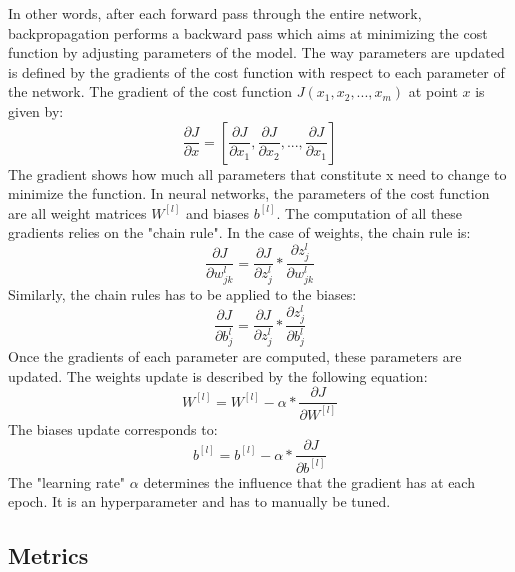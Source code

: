 In other words, after each forward pass through the entire network, backpropagation performs a backward pass which aims at minimizing the cost function by adjusting parameters of the model. The way parameters are updated is defined by the gradients of the cost function with respect to each parameter of the network. The gradient of the cost function $J(x_{1}, x_{2}, ..., x_{m})$ at point $x$ is given by:
\begin{equation}
\frac{\partial J}{\partial x} = [\frac{\partial J}{\partial x_{1}}, \frac{\partial J}{\partial x_{2}}, ..., \frac{\partial J}{\partial x_{1}}]
\end{equation}
The gradient shows how much all parameters that constitute x need to change to minimize the function. In neural networks, the parameters of the cost function are all weight matrices $W^{[l]}$ and biases $b^{[l]}$. The computation of all these gradients relies on the "chain rule". In the case of weights, the chain rule is:
\begin{equation}
\frac{\partial J}{\partial w_{jk}^{l}} = \frac{\partial J}{\partial z_{j}^{l}} * \frac{\partial z_{j}^{l}}{\partial w_{jk}^{l}}
\end{equation}
Similarly, the chain rules has to be applied to the biases:
\begin{equation}
\frac{\partial J}{\partial b_{j}^{l}} = \frac{\partial J}{\partial z_{j}^{l}} * \frac{\partial z_{j}^{l}}{\partial b_{j}^{l}}
\end{equation}
Once the gradients of each parameter are computed, these parameters are updated. The weights update is described by the following equation:
\begin{equation}
W^{[l]} = W^{[l]} - \alpha * \frac{\partial J}{\partial W^{[l]}}
\end{equation}
The biases update corresponds to:
\begin{equation}
b^{[l]} = b^{[l]} - \alpha * \frac{\partial J}{\partial b^{[l]}}
\end{equation}
The "learning rate" $\alpha$ determines the influence that the gradient has at each epoch. It is an hyperparameter and has to manually be tuned.


\subsection{Metrics}

